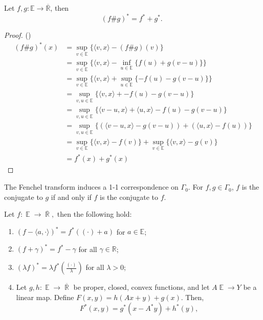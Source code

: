 \documentclass{tufte-handout}
\DeclareMathOperator{\R}{\mathbb{R}}
\DeclareMathOperator{\E}{\mathbb{E}}
\begin{document}
{\begin{proposition} Let $f, g: \mathbb{E} \rightarrow \overline{\mathbb{R}}$, then
$$
(f \# g)^{*}=f^{*}+g^{*} \text {. }
$$
  \begin{proof}()
  \begin{equation*}
    \begin{split}
      (f \# g)^*(x) &= \sup_{v \in \mathbb{E}}\{\langle v, x \rangle - (f \# g) (v)\}\\
      &= \sup_{v \in \mathbb{E}}\{\langle v, x \rangle -  \inf_{u \in \mathbb{E}} \{ f(u) + g(v-u) \}\} \\ 
      &= \sup_{v \in \mathbb{E}}\{\langle v, x \rangle   + \sup_{u \in \mathbb{E}} \{ -f(u) - g(v-u) \}\}  \\ 
      &= \sup_{v,u \in \mathbb{E}}\{\langle v, x \rangle   + -f(u) - g(v-u) \} \\ 
      &= \sup_{v,u \in \mathbb{E}}\{\langle v-u, x \rangle +  \langle u, x \rangle -f(u) - g(v-u) \} \\
      &= \sup_{v,u \in \mathbb{E}}\{(\langle v-u, x \rangle -g(v-u) )+  (\langle u, x \rangle-f(u)) \} \\ 
      &= \sup_{v \in \mathbb{E}}\{ \langle v,x\rangle -f(v) \} + \sup_{v \in \mathbb{E}}\{ \langle v,x\rangle -g(v) \}\\ 
      &= f^*(x) + g^*(x)
    \end{split}
  \end{equation*}
\end{proof}  
\end{proposition}
\begin{corollary}
  The Fenchel transform induces a 1-1 correspondence on $\Gamma_0$. For $f, g \in \Gamma_0$, $f$ is the conjugate to $g$ if and only if $f$ is the conjugate to $f$.  
\end{corollary}
\begin{proposition}
  Let $f: \E \to \overline{\R} ,$ then the following hold: 
  \begin{enumerate}
    \item $(f-\langle{a}, \cdot\rangle)^{*}=f^{*}((\cdot)+{a})$ for ${a} \in \mathbb{E}$;
\item $(f+\gamma)^{*}=f^{*}-\gamma$ for all $\gamma \in \mathbb{R}$;
\item $(\lambda f)^{*}=\lambda f^{*}\left(\frac{(\cdot)}{\lambda}\right)$ for all $\lambda>0$;
\item Let $g, h: \E \to \overline{\R}$ be proper, closed, convex functions, and let $A \E \to Y$ be a linear map. Define $F(x,y) = h(Ax + y) + g(x).$ Then, $$F^* (x,y ) = g^*(x- A^*y) + h^*(y), $$ 

\end{enumerate}
\end{proposition}}
\end{document}
